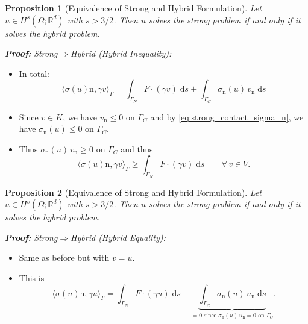 \documentclass[10pt,aspectratio=169]{beamer}
\newtheorem{proposition}{Proposition}[section]
\def\R{{\mathbb R}}
\def\d{{\mathrm{d}}}
\def\ds{{\d s}}
\begin{document}
\begin{frame}
	\begin{proposition}[Equivalence of Strong and Hybrid Formulation]
		Let $u\in H^s(\Omega;\R^d)$ with $s>3/2$. Then $u$ solves the strong problem if and only if it solves the hybrid problem.
	\end{proposition}
	\textbf{\em Proof:} {\em Strong\enspace}$\Longrightarrow${\em\enspace Hybrid (Hybrid Inequality):}
	\begin{itemize}
		\item In total:
		      \begin{equation*}
			      \langle \sigma(u)\mathrm n,\gamma v\rangle_\Gamma
			      = \int_{\Gamma_N}F\cdot(\gamma v)\;\ds + \int_{\Gamma_C} \sigma_\mathrm{n}(u)\, v_\mathrm{n}\;\ds
		      \end{equation*}
		\item Since $v\in K$, we have $v_\mathrm{n}\le 0$ on $\Gamma_C$ and by \eqref{eq:strong_contact_sigma_n}, we have $\sigma_\mathrm{n}(u)\le 0$ on $\Gamma_C$.
		\item Thus $\sigma_\mathrm{n}(u)\, v_\mathrm{n}\ge 0$ on $\Gamma_C$ and thus
		      \begin{equation*}
			      \langle \sigma(u)\mathrm n,\gamma v\rangle_\Gamma
			      \ge \int_{\Gamma_N}F\cdot(\gamma v)\;\ds\qquad \forall\, v\in V.
		      \end{equation*}
	\end{itemize}
\end{frame}

\begin{frame}
	\begin{proposition}[Equivalence of Strong and Hybrid Formulation]
		Let $u\in H^s(\Omega;\R^d)$ with $s>3/2$. Then $u$ solves the strong problem if and only if it solves the hybrid problem.
	\end{proposition}
	\textbf{\em Proof:} {\em Strong\enspace}$\Longrightarrow${\em\enspace Hybrid (Hybrid Equality):}
	\begin{itemize}
		\item Same as before but with $v = u$.
		\item This is
		      \begin{equation*}
			      \langle \sigma(u)\mathrm n,\gamma u\rangle_\Gamma
			      = \int_{\Gamma_N}F\cdot(\gamma u)\;\ds + \underbrace{\int_{\Gamma_C} \sigma_\mathrm{n}(u)\, u_\mathrm{n}\;\ds}_{=0\text{ since }\sigma_\mathrm{n}(u)\, u_\mathrm{n}=0\text{ on }\Gamma_C}.
		      \end{equation*}
	\end{itemize}
\end{frame}
\end{document}
